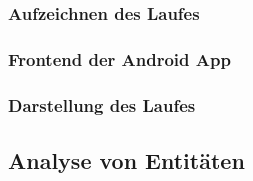 \subsubsection{Aufzeichnen des Laufes}
\subsubsection{Frontend der Android App}
\subsubsection{Darstellung des Laufes}

\subsection{Analyse von Entitäten}
